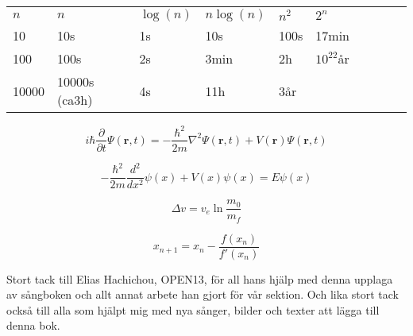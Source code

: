 
\begin{tabular}{@{}ll@{}ll@{}ll@{}ll@{}ll@{}}
$n$ & $n$ & $\log(n)$ & $n\log(n)$ & $n^2$ & $2^n$\\
10  & 10s & 1s & 10s & 100s & 17min \\
100 & 100s & 2s & 3min & 2h & $10^22$år \\
10000  & 10000s (ca3h) & 4s & 11h & 3år\\
\end{tabular}


\begin{equation}
i \hbar \frac{\partial}{\partial t} \Psi (\textbf{r},t) = - \frac{\hbar^2}{2m} \nabla^2 \Psi (\textbf{r},t) + V(\textbf{r}) \Psi (\textbf{r},t)
\end{equation}

\begin{equation}
- \frac{\hbar^2}{2m} \frac{d^2}{d x^2} \psi (x) + V(x) \psi (x) = E \psi (x)
\end{equation}


\begin{equation}
\Delta v = v_e \ln \frac{m_0}{m_f}
\end{equation}


\begin{equation}
x_{n+1} = x_n - \frac{f(x_n)}{f'(x_n)}
\end{equation}

\newpage

\hspace{2cm}

Stort tack till Elias Hachichou, OPEN13, för all hans hjälp med denna upplaga av sångboken och allt annat arbete han gjort för vår sektion. Och lika stort tack också till alla som hjälpt mig med nya sånger, bilder och texter att lägga till denna bok. 

